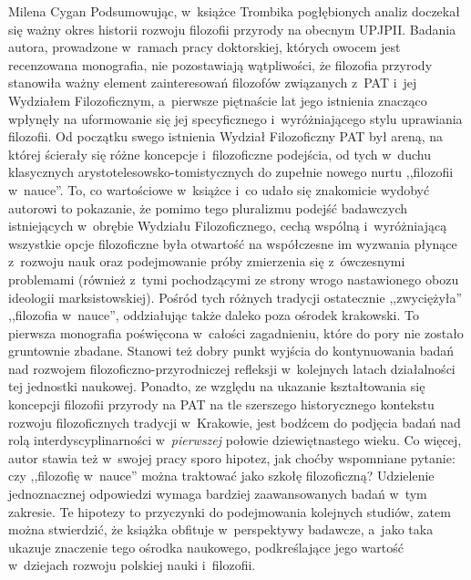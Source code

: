 \begin{newrevplenv}{Milena Cygan}
Podsumowując, w~książce Trombika pogłębionych analiz doczekał się ważny okres historii rozwoju filozofii przyrody na obecnym UPJPII. Badania autora, prowadzone w~ramach pracy doktorskiej, których owocem jest recenzowana monografia, nie pozostawiają wątpliwości, że filozofia przyrody stanowiła ważny element zainteresowań filozofów związanych z~PAT i~jej Wydziałem Filozoficznym, a~pierwsze piętnaście lat jego istnienia znacząco wpłynęły na uformowanie się jej specyficznego i~wyróżniającego stylu uprawiania filozofii. Od początku swego istnienia Wydział Filozoficzny PAT był areną, na której ścierały się różne koncepcje i~filozoficzne podejścia, od tych w~duchu klasycznych arystotelesowsko-tomistycznych do zupełnie nowego nurtu ,,filozofii w~nauce''. To, co wartościowe w~książce i~co udało się znakomicie wydobyć autorowi to pokazanie, że pomimo tego pluralizmu podejść badawczych istniejących w~obrębie Wydziału Filozoficznego, cechą wspólną i~wyróżniającą wszystkie opcje filozoficzne była otwartość na współczesne im wyzwania płynące z~rozwoju nauk oraz podejmowanie próby zmierzenia się z~ówczesnymi problemami (również z~tymi pochodzącymi ze strony wrogo nastawionego obozu ideologii marksistowskiej). Pośród tych różnych tradycji ostatecznie ,,zwyciężyła'' ,,filozofia w~nauce'', oddziałując także daleko poza ośrodek krakowski. To pierwsza monografia poświęcona w~całości zagadnieniu, które do pory nie zostało gruntownie zbadane. Stanowi też dobry punkt wyjścia do kontynuowania badań nad rozwojem filozoficzno-przyrodniczej refleksji w~kolejnych latach działalności tej jednostki naukowej. Ponadto, ze względu na ukazanie kształtowania się koncepcji filozofii przyrody na PAT na tle szerszego historycznego kontekstu rozwoju filozoficznych tradycji w~Krakowie, jest bodźcem do podjęcia badań nad rolą interdyscyplinarności w~\textit{pierwszej} połowie dziewiętnastego wieku. Co więcej, autor stawia też w~swojej pracy sporo hipotez, jak choćby wspomniane pytanie: czy ,,filozofię w~nauce'' można traktować jako szkołę filozoficzną? Udzielenie jednoznacznej odpowiedzi wymaga bardziej zaawansowanych badań w~tym zakresie. Te hipotezy to przyczynki do podejmowania kolejnych studiów, zatem można stwierdzić, że książka obfituje w~perspektywy badawcze, a~jako taka ukazuje znaczenie tego ośrodka naukowego, podkreślające jego wartość w~dziejach rozwoju polskiej nauki i~filozofii.




\vspace{5mm}%
\begin{flushright}
{\chaptitleeng\color{black!50}{Between tradition and modernity -- Lorem ipsum}}
\end{flushright}


\end{newrevplenv}
